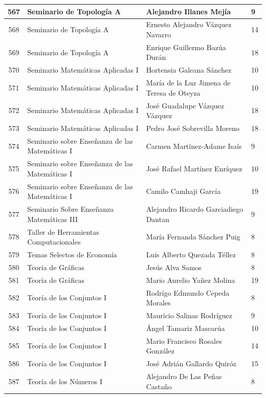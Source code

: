 {\begin{longtable}{|c|p{6.5cm}|p{5cm}|p{1.5cm}|}
  567 & Seminario de Topología A & Alejandro Illanes Mejía & 9 \\ \hline 
  568 & Seminario de Topología A & Ernesto Alejandro Vázquez Navarro & 14 \\ \hline 
  569 & Seminario de Topología A & Enrique Guillermo Bazúa Durán & 18 \\ \hline 
  570 & Seminario Matemáticas Aplicadas I & Hortensia Galeana Sánchez & 10 \\ \hline 
  571 & Seminario Matemáticas Aplicadas I & María de la Luz Jimena de Teresa de Oteyza & 10 \\ \hline 
  572 & Seminario Matemáticas Aplicadas I & José Guadalupe Vázquez Vázquez & 18 \\ \hline 
  573 & Seminario Matemáticas Aplicadas I & Pedro José Sobrevilla Moreno & 18 \\ \hline 
  574 & Seminario sobre Enseñanza de las Matemáticas I & Carmen Martínez-Adame Isaís & 9 \\ \hline 
  575 & Seminario sobre Enseñanza de las Matemáticas I & José Rafael Martínez Enríquez & 10 \\ \hline 
  576 & Seminario sobre Enseñanza de las Matemáticas I & Camilo Camhaji García & 19 \\ \hline 
  577 & Seminario Sobre Enseñanza Matemáticas III & Alejandro Ricardo Garciadiego Dantan & 9 \\ \hline 
  578 & Taller de Herramientas Computacionales & María Fernanda Sánchez Puig & 8 \\ \hline 
  579 & Temas Selectos de Economía & Luis Alberto Quezada Téllez & 8 \\ \hline 
  580 & Teoría de Gráficas & Jesús Alva Samos & 8 \\ \hline 
  581 & Teoría de Gráficas & Mario Aurelio Yañez Molina & 19 \\ \hline 
  582 & Teoría de los Conjuntos I & Rodrígo Edmundo Cepeda Morales & 8 \\ \hline 
  583 & Teoría de los Conjuntos I & Mauricio Salinas Rodríguez & 9 \\ \hline 
  584 & Teoría de los Conjuntos I & Ángel Tamariz Mascarúa & 10 \\ \hline 
  585 & Teoría de los Conjuntos I & Mario Francisco Rosales González & 14 \\ \hline 
  586 & Teoría de los Conjuntos I & José Adrián Gallardo Quiróz & 15 \\ \hline 
  587 & Teoría de los Números I & Alejandro De Las Peñas Castaño & 8 \\ \hline 

\end{longtable}}
